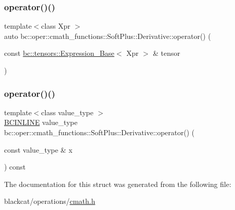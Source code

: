 \mbox{\label{structbc_1_1oper_1_1cmath__functions_1_1SoftPlus_1_1Derivative_a4643ee554049029c87d97ca5a4a98493}} 
\subsubsection{\texorpdfstring{operator()()}{operator()()}\hspace{0.1cm}{\footnotesize\ttfamily [2/3]}}
{\footnotesize\ttfamily template$<$class Xpr $>$ \\
auto bc\+::oper\+::cmath\+\_\+functions\+::\+Soft\+Plus\+::\+Derivative\+::operator() (\begin{DoxyParamCaption}\item[{const \hyperlink{classbc_1_1tensors_1_1Expression__Base}{bc\+::tensors\+::\+Expression\+\_\+\+Base}$<$ Xpr $>$ \&}]{tensor }\end{DoxyParamCaption})\hspace{0.3cm}{\ttfamily [inline]}}

\mbox{\label{structbc_1_1oper_1_1cmath__functions_1_1SoftPlus_1_1Derivative_a449bbe8797b2c7ab3ae4ee3bec439fdb}} 
\subsubsection{\texorpdfstring{operator()()}{operator()()}\hspace{0.1cm}{\footnotesize\ttfamily [3/3]}}
{\footnotesize\ttfamily template$<$class value\+\_\+type $>$ \\
\hyperlink{common_8h_a6699e8b0449da5c0fafb878e59c1d4b1}{B\+C\+I\+N\+L\+I\+NE} value\+\_\+type bc\+::oper\+::cmath\+\_\+functions\+::\+Soft\+Plus\+::\+Derivative\+::operator() (\begin{DoxyParamCaption}\item[{const value\+\_\+type \&}]{x }\end{DoxyParamCaption}) const\hspace{0.3cm}{\ttfamily [inline]}}



The documentation for this struct was generated from the following file\+:\begin{DoxyCompactItemize}
\item 
blackcat/operations/\hyperlink{cmath_8h}{cmath.\+h}\end{DoxyCompactItemize}
